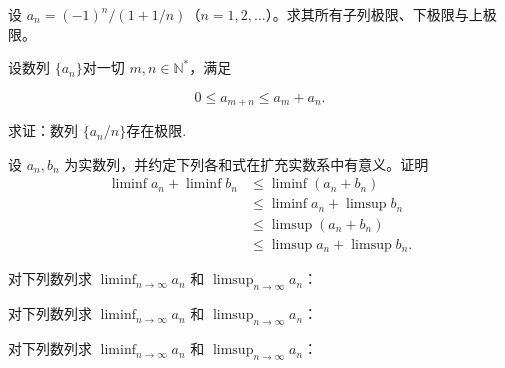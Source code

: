 \newpage
\noindent\begin{minipage}{\textwidth}
设 $a_n=(-1)^n/(1+1/n)$（$n=1,2,\ldots$）。求其所有子列极限、下极限与上极限。
\end{minipage}\par\vfill
\noindent\begin{minipage}{\textwidth}
设数列 $ \{a_n\} $对一切 $ m,n\in\mathbb{N}^* $，满足

\[0\leqslant a_{m+n}\leqslant a_{m}+a_{n}.\]

求证：数列 $ \{a_{n}/n\} $存在极限.
\end{minipage}\par\vfill
\noindent\begin{minipage}{\textwidth}
设 $a_n,b_n$ 为实数列，并约定下列各和式在扩充实数系中有意义。证明\[\begin{aligned}\liminf a_n+\liminf b_n&\le\liminf(a_n+b_n)\\&\le\liminf a_n+\limsup b_n\\&\le\limsup(a_n+b_n)\\&\le\limsup a_n+\limsup b_n.\end{aligned}\]
\end{minipage}\par\vfill
\newpage
\noindent\begin{minipage}{\textwidth}
对下列数列求 $\liminf_{n\to\infty}a_n$ 和 $\limsup_{n\to\infty}a_n$：
\end{minipage}\par\vfill
\noindent\begin{minipage}{\textwidth}
对下列数列求 $\liminf_{n\to\infty}a_n$ 和 $\limsup_{n\to\infty}a_n$：
\end{minipage}\par\vfill
\noindent\begin{minipage}{\textwidth}
对下列数列求 $\liminf_{n\to\infty}a_n$ 和 $\limsup_{n\to\infty}a_n$：
\end{minipage}\par\vfill
